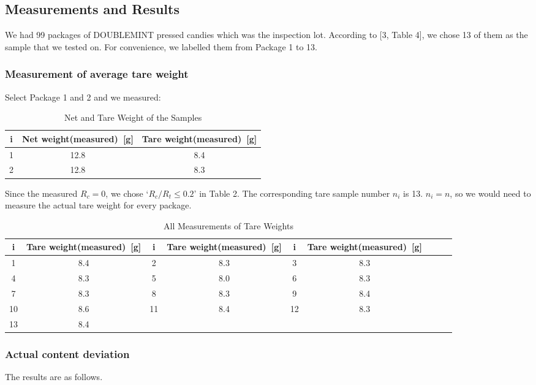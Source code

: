 \documentclass[a4paper]{article}
\begin{document}
\subsection{Measurements and Results}
We had 99 packages of DOUBLEMINT pressed candies which was the inspection lot. According to [3, Table 4],  we chose 13 of them as the sample that we tested on. For convenience, we labelled them from Package 1 to 13.
\subsubsection{Measurement of average tare weight}
Select Package 1 and 2 and we measured:
\begin{table}[!htbp]
\centering
\begin{tabular}{|c|c|c|}
\hline
i&Net weight(measured)\ [g]&Tare weight(measured)\ [g]
\\\hline
1&12.8&8.4
\\\hline
2&12.8&8.3
\\\hline
\end{tabular}  
\caption{Net and Tare Weight of the Samples}
\end{table}

Since the measured $R_c=0$, we chose `$R_c/R_t \leq 0.2$' in Table 2. The corresponding tare sample number $n_i$ is 13. $n_i = n$, so we would need to measure the actual tare weight for every package.
\begin{table}[!htbp]
\centering
\begin{tabular}{|c|c|c|c|c|c|c|c|c|}
\hline
i&Tare weight(measured)\ [g]&i&Tare weight(measured)\ [g]&i&Tare weight(measured)\ [g]
\\\hline
1&8.4&2&8.3&3&8.3
\\\hline
4&8.3&5&8.0&6&8.3
\\\hline
7&8.3&8&8.3&9&8.4
\\\hline
10&8.6&11&8.4&12&8.3
\\\hline
13&8.4&&&&
\\\hline
\end{tabular}  
\caption{All Measurements of Tare Weights}
\end{table}

\subsubsection{Actual content deviation}
The results are as follows.
\end{document}

